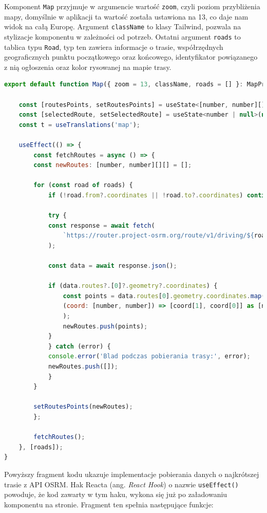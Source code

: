Komponent \texttt{Map} przyjmuje w argumencie wartość \texttt{zoom}, czyli poziom przybliżenia mapy, domyślnie w aplikacji ta wartość została ustawiona na 13, co daje nam widok na całą Europę. Argument \texttt{className} to klasy Tailwind, pozwala na stylizacje komponentu w zależności od potrzeb. Ostatni argument \texttt{roads} to tablica typu \texttt{Road}, typ ten zawiera informacje o trasie, współrzędnych geograficznych punktu początkowego oraz końcowego, identyfikator powiązanego z nią ogłoszenia oraz kolor rysowanej na mapie trasy.

\pagebreak
{\belowcaptionskip=-9pt
\begin{lstlisting}[language=JavaScript,caption=Implementacja pobierania najkrótszych tras między punktami, label=lst:fetchRoutes]
export default function Map({ zoom = 13, className, roads = [] }: MapProps) {

    const [routesPoints, setRoutesPoints] = useState<[number, number][][]>([]);
    const [selectedRoute, setSelectedRoute] = useState<number | null>(null);
    const t = useTranslations('map');

    useEffect(() => {
        const fetchRoutes = async () => {
        const newRoutes: [number, number][][] = [];

        for (const road of roads) {
            if (!road.from?.coordinates || !road.to?.coordinates) continue;

            try {
            const response = await fetch(
                `https://router.project-osrm.org/route/v1/driving/${road.from.coordinates[1]},${road.from.coordinates[0]};${road.to.coordinates[1]},${road.to.coordinates[0]}?overview=full&geometries=geojson`,
            );

            const data = await response.json();

            if (data.routes?.[0]?.geometry?.coordinates) {
                const points = data.routes[0].geometry.coordinates.map(
                (coord: [number, number]) => [coord[1], coord[0]] as [number, number],
                );
                newRoutes.push(points);
            }
            } catch (error) {
            console.error('Blad podczas pobierania trasy:', error);
            newRoutes.push([]);
            }
        }

        setRoutesPoints(newRoutes);
        };

        fetchRoutes();
    }, [roads]);
}
  \end{lstlisting}
}
  \pagebreak
  Powyższy fragment kodu ukazuje implementacje pobierania danych o najkrótszej trasie z API OSRM. Hak Reacta (ang. \emph{React Hook}) o nazwie \texttt{useEffect()} powoduje, że kod zawarty w tym haku, wykona się już po załadowaniu komponentu na stronie. Fragment ten spełnia następujące funkcje:
